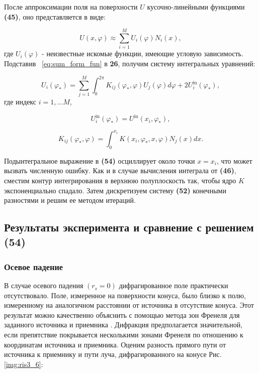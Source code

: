 После аппроксимации поля на поверхности $U$ кусочно-линейными функциями \textbf{(45)}, оно представляется в виде:

\begin{equation}
\label{eq:sum_form_fun}
U(x, \varphi) \approx \sum_{i=1}^{M} U_i(\varphi) N_i(x),
\end{equation}
где $U_i(\varphi)$ - неизвестные искомые функции, имеющие угловую зависимость. Подставив ~\eqref{eq:sum_form_fun} в \textbf{26}, получим систему интегральных уравнений:

\begin{equation}
U_i(\varphi_*) = \sum_{j=1}^{M} \int_{0}^{2 \pi} K_{ij} (\varphi_*, \varphi) U_j(\varphi) d\varphi + 2 U_i^{\text{in}}(\varphi_*),
\end{equation}
где индекс $i = 1, \dots M$,

\begin{equation}
U^{\text{in}}_i(\varphi_*) = U^{\text{in}}(x_i, \varphi_*),
\end{equation}

\begin{equation}
K_{ij}(\varphi_*, \varphi) = \int_{0}^{x_i} K(x_i, \varphi_*, x, \varphi) N_j(x) dx.
\end{equation}

Подынтегральное выражение в \textbf{(54)} осциллирует около точки $x = x_i$, что может вызвать численную ошибку. Как и в случае вычисления интеграла от \textbf{(46)}, сместим контур интегрирования в верхнюю полуплоскость так, чтобы ядро $K$ экспоненциально спадало. Затем дискретизуем систему \textbf{(52)} конечными разностями и решим ее методом итераций.

\subsection{Результаты эксперимента и сравнение с решением (54)}

\subsubsection{Осевое падение}

В случае осевого падения $(r_s = 0)$ дифрагированное поле практически отсутствовало. Поле, измеренное на поверхности конуса, было близко к полю, измеренному на аналогичном расстоянии от источника в отсутствие конуса. Этот результат можно качественно объяснить с помощью метода зон Френеля для заданного источника и приемника \cite{Kravtsov}. Дифракция предполагается значительной, если препятствие покрывается несколькими зонами Френеля по отношению к координатам источника и приемника. Оценим разность прямого пути от источника к приемнику и пути луча, дифрагированного на конусе Рис. \ref{img:ris3_6}:

